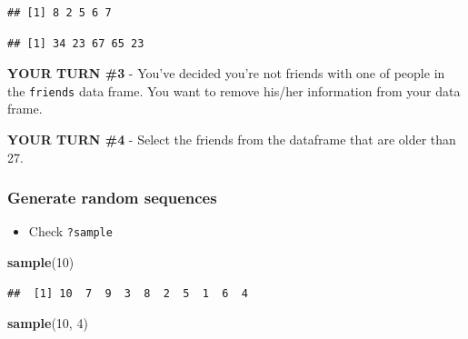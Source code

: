 \documentclass[
]{article}
\newenvironment{Shaded}{\begin{snugshade}}{\end{snugshade}}
\newcommand{\CommentTok}[1]{\textcolor[rgb]{0.56,0.35,0.01}{\textit{#1}}}
\newcommand{\DecValTok}[1]{\textcolor[rgb]{0.00,0.00,0.81}{#1}}
\newcommand{\KeywordTok}[1]{\textcolor[rgb]{0.13,0.29,0.53}{\textbf{#1}}}
\newcommand{\NormalTok}[1]{#1}
\newcommand{\OperatorTok}[1]{\textcolor[rgb]{0.81,0.36,0.00}{\textbf{#1}}}
\providecommand{\tightlist}{%
  \setlength{\itemsep}{0pt}\setlength{\parskip}{0pt}}
\begin{document}
\begin{Shaded}
\end{Shaded}

\begin{verbatim}
## [1] 8 2 5 6 7
\end{verbatim}

\begin{Shaded}
\end{Shaded}

\begin{verbatim}
## [1] 34 23 67 65 23
\end{verbatim}

\textbf{YOUR TURN \#3} - You've decided you're not friends with one of
people in the \texttt{friends} data frame. You want to remove his/her
information from your data frame.

\textbf{YOUR TURN \#4} - Select the friends from the dataframe that are
older than 27.

\hypertarget{generate-random-sequences}{%
\subsubsection{Generate random
sequences}\label{generate-random-sequences}}

\begin{itemize}
\tightlist
\item
  Check \texttt{?sample}
\end{itemize}

\begin{Shaded}
\begin{Highlighting}[]
\KeywordTok{sample}\NormalTok{(}\DecValTok{10}\NormalTok{)}
\end{Highlighting}
\end{Shaded}

\begin{verbatim}
##  [1] 10  7  9  3  8  2  5  1  6  4
\end{verbatim}

\begin{Shaded}
\begin{Highlighting}[]
\KeywordTok{sample}\NormalTok{(}\DecValTok{10}\NormalTok{, }\DecValTok{4}\NormalTok{)}
\end{Highlighting}
\end{Shaded}
\end{document}
